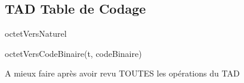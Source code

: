 \subsection{TAD Table de Codage}

\begin{tad}
    \begin{tadOperations}{octetVersNaturel}
       
       
    \end{tadOperations}

    \begin{tadPreconditions}{octetVersCodeBinaire(t, codeBinaire)}
    \end{tadPreconditions}

    \begin{tadAxiomes}{}
        A mieux faire 	après avoir revu TOUTES les opérations du TAD
    \end{tadAxiomes}

\end{tad}
